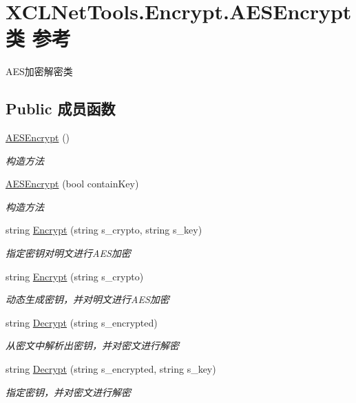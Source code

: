 \hypertarget{class_x_c_l_net_tools_1_1_encrypt_1_1_a_e_s_encrypt}{\section{X\-C\-L\-Net\-Tools.\-Encrypt.\-A\-E\-S\-Encrypt类 参考}
\label{class_x_c_l_net_tools_1_1_encrypt_1_1_a_e_s_encrypt}
}


A\-E\-S加密解密类  


\subsection*{Public 成员函数}
\begin{DoxyCompactItemize}
\item 
\hyperlink{class_x_c_l_net_tools_1_1_encrypt_1_1_a_e_s_encrypt_a5fb828cbf3cf36b59138650043c2a559}{A\-E\-S\-Encrypt} ()
\begin{DoxyCompactList}\small\item\em 构造方法 \end{DoxyCompactList}\item 
\hyperlink{class_x_c_l_net_tools_1_1_encrypt_1_1_a_e_s_encrypt_a1c8a3b1284f7846bae3a273cc1ccc055}{A\-E\-S\-Encrypt} (bool contain\-Key)
\begin{DoxyCompactList}\small\item\em 构造方法 \end{DoxyCompactList}\item 
string \hyperlink{class_x_c_l_net_tools_1_1_encrypt_1_1_a_e_s_encrypt_af5664c832b91bec53e4f5ede0ac04afb}{Encrypt} (string s\-\_\-crypto, string s\-\_\-key)
\begin{DoxyCompactList}\small\item\em 指定密钥对明文进行\-A\-E\-S加密 \end{DoxyCompactList}\item 
string \hyperlink{class_x_c_l_net_tools_1_1_encrypt_1_1_a_e_s_encrypt_a7c3fb0d592414659abd08468847c374f}{Encrypt} (string s\-\_\-crypto)
\begin{DoxyCompactList}\small\item\em 动态生成密钥，并对明文进行\-A\-E\-S加密 \end{DoxyCompactList}\item 
string \hyperlink{class_x_c_l_net_tools_1_1_encrypt_1_1_a_e_s_encrypt_ac8c024479b061e0d7d1a83308a2cbe99}{Decrypt} (string s\-\_\-encrypted)
\begin{DoxyCompactList}\small\item\em 从密文中解析出密钥，并对密文进行解密 \end{DoxyCompactList}\item 
string \hyperlink{class_x_c_l_net_tools_1_1_encrypt_1_1_a_e_s_encrypt_ab7e79827a218ac4ac89893b1fde2df4c}{Decrypt} (string s\-\_\-encrypted, string s\-\_\-key)
\begin{DoxyCompactList}\small\item\em 指定密钥，并对密文进行解密 \end{DoxyCompactList}\end{DoxyCompactItemize}
